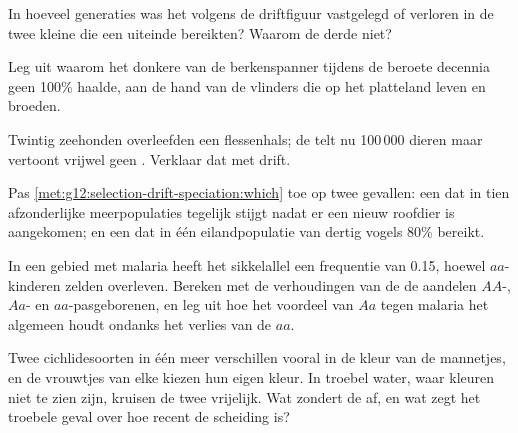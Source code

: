 \begin{exercise}[$\star\star$]\label{exo:g12:selection-drift-speciation:8}
In hoeveel generaties was het  volgens de driftfiguur vastgelegd of
verloren in de twee kleine  die een uiteinde bereikten? Waarom
de derde niet?
\end{exercise}

\begin{exercise}[$\star\star$]\label{exo:g12:selection-drift-speciation:9}
Leg uit waarom het donkere  van de berkenspanner tijdens de beroete
decennia geen 100\% haalde, aan de hand van de vlinders die op het
platteland leven en broeden.
\end{exercise}

\begin{exercise}[$\star\star$]\label{exo:g12:selection-drift-speciation:10}
Twintig zeehonden overleefden een flessenhals; de  telt nu
100\,000 dieren maar vertoont vrijwel geen .
Verklaar dat met drift.
\end{exercise}

\begin{exercise}[$\star\star$]\label{exo:g12:selection-drift-speciation:11}
Pas \cref{met:g12:selection-drift-speciation:which} toe op twee gevallen:
een  dat in tien afzonderlijke meerpopulaties tegelijk stijgt nadat
er een nieuw roofdier is aangekomen; en een  dat in één
eilandpopulatie van dertig vogels 80\% bereikt.
\end{exercise}

\begin{exercise}[$\star\star\star$]\label{exo:g12:selection-drift-speciation:12}
In een gebied met malaria heeft het sikkelallel een frequentie van 0.15,
hoewel $aa$-kinderen zelden overleven. Bereken met de verhoudingen van de
 de aandelen $AA$-, $Aa$- en $aa$-pasgeborenen, en leg uit hoe
het voordeel van $Aa$ tegen malaria het  algemeen houdt ondanks het
verlies van de $aa$.
\end{exercise}

\begin{exercise}[$\star\star\star$]\label{exo:g12:selection-drift-speciation:13}
Twee cichlidesoorten in één meer verschillen vooral in de kleur van de
mannetjes, en de vrouwtjes van elke  kiezen hun eigen kleur. In
troebel water, waar kleuren niet te zien zijn, kruisen de twee vrijelijk.
Wat zondert de  af, en wat zegt het troebele geval over hoe recent
de scheiding is?
\end{exercise}


